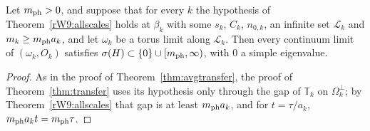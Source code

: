 \begin{corollary}\label{rW9:allscalescont}
Let $m_{\rm ph}>0$, and suppose that for every $k$ the hypothesis of
Theorem~\ref{rW9:allscales} holds at $\beta_k$ with some $s_k$, $C_k$, $n_{0,k}$,
an infinite set $\mathcal L_k$ and $m_k\ge m_{\rm ph} a_k$, and let $\omega_k$ be a
torus limit along $\mathcal L_k$. Then every continuum limit of $(\omega_k,
O_k)$ satisfies $\sigma(H)\subset\{0\}\cup[m_{\rm ph},\infty)$, with $0$ a simple
eigenvalue.
\end{corollary}

\begin{proof}
As in the proof of Theorem~\ref{thm:avgtransfer}, the proof of
Theorem~\ref{thm:transfer} uses its hypothesis only through the gap of
$\mathbb T_k$ on $\Omega_k^\perp$; by Theorem~\ref{rW9:allscales} that gap
is at least $m_{\rm ph} a_k$, and for $t=\tau/a_k$, $m_{\rm ph} a_kt=m_{\rm ph}\tau$.
\end{proof}

